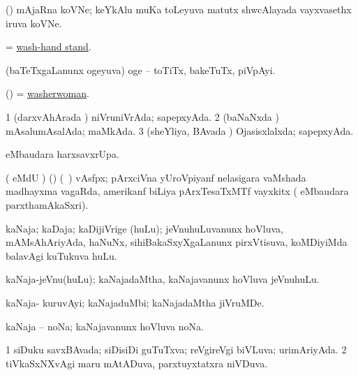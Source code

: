 \bentry
{} 
\gl{\nA}
\expl{}
\bmng
(\ame) mAjaRna koVNe; keYkAlu muKa toLeyuva matutx shwcAlayada vayxvasethx iruva koVNe. 
\emng
\eentry

\bentry
{} 
\gl{\nA}
\expl{}
\bmng
= \hyperlink{wash-hand stand}{wash-hand stand}. 
\emng
\eentry

\bentry
{} 
\gl{\nA}
\expl{}
\bmng
(baTeTxgaLanunx ogeyuva) oge -- toTiTx, bakeTuTx, piVpAyi. 
\emng
\eentry

\bentry
{} 
\gl{\nA}
\expl{}
\bmng
(\ame) = \hyperlink{washerwoman}{washerwoman}. 
\emng
\eentry

\bentry
{} 
\gl{\gu}
\expl{}
\bmng
\bnum
\num{1} (darxvAhArada \vi) niVruniVrAda; sapepxyAda. 
\num{2} (baNaNxda \vi) mAsalumAsalAda; maMkAda. 
\num{3} (sheYliya, BAvada \vi) Ojasisxlalxda; sapepxyAda. 
\enum
\emng
\eentry

\bentry
{} 
\bmng
{} eMbaudara harxsavxrUpa. 
\emng
\eentry

\bentry
{} 
\gl{\nA}
\expl{}
\bmng
( eMdU \parx) (\ame) (\sA\ \hiV) vAsfpx; pArxciVna yUroVpiyanf nelasigara vaMshada madhayxma vagaRda, amerikanf biLiya pArxTesaTxMTf vayxkitx ( eMbaudara parxthamAkaSxri). 
\emng
\eentry

{} 
\gl{\nA}
\expl{}
\bmng
kaNaja; kaDaja; kaDijiVrige (huLu); jeVnuhuLuvanunx hoVluva, mAMsAhAriyAda, haNuNx, sihiBakaSxyXgaLanunx pirxVtisuva, koMDiyiMda balavAgi kuTukuva huLu.  
\emng
\eentry

\bentry
{} 
\gl{\nA}
\expl{}
\bmng
kaNaja-jeVnu(huLu); kaNajadaMtha, kaNajavanunx hoVluva jeVnuhuLu. 
\emng
\eentry

\bentry
{} 
\gl{\nA}
\expl{}
\bmng
kaNaja- kuruvAyi; kaNajaduMbi; kaNajadaMtha jiVruMDe. 
\emng
\eentry

\bentry
{} 
\gl{\nA}
\expl{}
\bmng
kaNaja -- noNa; kaNajavanunx hoVluva noNa. 
\emng
\eentry

\bentry
{} 
\gl{\gu}
\expl{}
\bmng
\bnum
\num{1} siDuku savxBAvada; siDisiDi guTuTxva; reVgireVgi biVLuva; urimAriyAda. 
\num{2} tiVkaSxNXvAgi maru mAtADuva, parxtuyxtatxra niVDuva. 
\enum
\emng
\eentry

